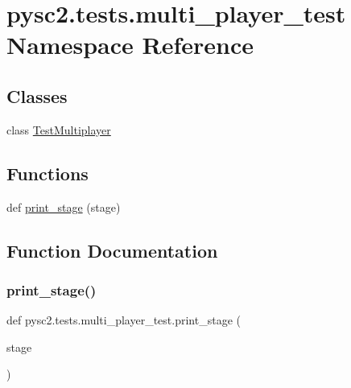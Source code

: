 \hypertarget{namespacepysc2_1_1tests_1_1multi__player__test}{}\section{pysc2.\+tests.\+multi\+\_\+player\+\_\+test Namespace Reference}
\label{namespacepysc2_1_1tests_1_1multi__player__test}
\subsection*{Classes}
\begin{DoxyCompactItemize}
\item 
class \mbox{\hyperlink{classpysc2_1_1tests_1_1multi__player__test_1_1_test_multiplayer}{Test\+Multiplayer}}
\end{DoxyCompactItemize}
\subsection*{Functions}
\begin{DoxyCompactItemize}
\item 
def \mbox{\hyperlink{namespacepysc2_1_1tests_1_1multi__player__test_a6cb13892915b630680c87703f6c6dd8d}{print\+\_\+stage}} (stage)
\end{DoxyCompactItemize}


\subsection{Function Documentation}
\mbox{\label{namespacepysc2_1_1tests_1_1multi__player__test_a6cb13892915b630680c87703f6c6dd8d}} 
\subsubsection{\texorpdfstring{print\+\_\+stage()}{print\_stage()}}
{\footnotesize\ttfamily def pysc2.\+tests.\+multi\+\_\+player\+\_\+test.\+print\+\_\+stage (\begin{DoxyParamCaption}\item[{}]{stage }\end{DoxyParamCaption})}

